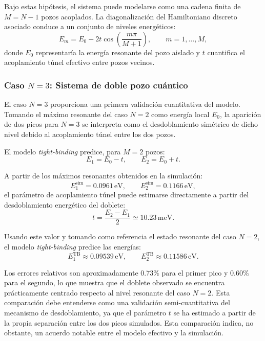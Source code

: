 \documentclass[a4paper,12pt]{article}
\begin{document}
Bajo estas hipótesis, el sistema puede modelarse como una cadena finita de $M=N-1$ pozos acoplados. La diagonalización del Hamiltoniano discreto asociado conduce a un conjunto de niveles energéticos:
\begin{equation}
E_m = E_0 - 2t\cos\left(\frac{m\pi}{M+1}\right),
\qquad m=1,\dots,M,
\label{eq:tightbinding}
\end{equation}
donde $E_0$ representaría la energía resonante del pozo aislado y $t$ cuantifica el acoplamiento túnel efectivo entre pozos vecinos.

\subsubsection{Caso $N=3$: Sistema de doble pozo cuántico}
El caso $N=3$ proporciona una primera validación cuantitativa del modelo. Tomando el máximo resonante del caso $N=2$ como energía local $E_0$, la aparición de dos picos para $N=3$ se interpreta como el desdoblamiento simétrico de dicho nivel debido al acoplamiento túnel entre los dos pozos. 

El modelo \textit{tight-binding} predice, para $M=2$ pozos:
\[
E_1=E_0-t, \qquad E_2=E_0+t.
\]

A partir de los máximos resonantes obtenidos en la simulación:
\[
E_1^{\mathrm{sim}}=0.0961\,\mathrm{eV},
\qquad
E_2^{\mathrm{sim}}=0.1166\,\mathrm{eV},
\]
el parámetro de acoplamiento túnel puede estimarse directamente a partir del desdoblamiento energético del doblete:
\[
t=\frac{E_2-E_1}{2}\simeq 10.23\,\mathrm{meV}.
\]

Usando este valor y tomando como referencia el estado resonante del caso $N=2$, el modelo \textit{tight-binding} predice las energías:
\[
E_1^{\mathrm{TB}}\approx 0.09539\,\mathrm{eV},
\qquad
E_2^{\mathrm{TB}}\approx 0.11586\,\mathrm{eV}.
\]


Los errores relativos son aproximadamente $0.73\%$ para el primer pico y $0.60\%$ para el segundo, lo que muestra que el doblete observado se encuentra prácticamente centrado respecto al nivel resonante del caso $N=2$. Esta comparación debe entenderse como una validación semi-cuantitativa del mecanismo de desdoblamiento, ya que el parámetro $t$ se ha estimado a partir de la propia separación entre los dos picos simulados. Esta comparación indica, no obstante, un acuerdo notable entre el modelo efectivo y la simulación.
\end{document}
